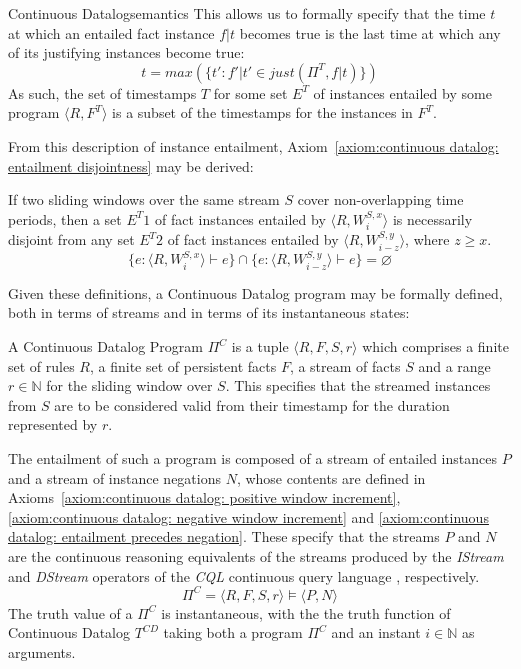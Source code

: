 \begin{nestedsection}{Continuous Datalog}{semantics}
This allows us to formally specify that the time $t$ at which an entailed fact
instance ${f | t}$ becomes true is the last time at which any of its
justifying instances become true:
\[ t = max(\{ t' : f' | t' \in just(\Pi^T, f | t) \}) \]
As such, the set of timestamps $T$ for some set $E^T$ of instances entailed by some
program ${\langle R, F^T \rangle}$ is a subset of the timestamps for the instances in $F^T$.

From this description of instance entailment,
Axiom~\ref{axiom:continuous datalog: entailment disjointness} may be
derived:

\begin{axiom}\label{axiom:continuous datalog: entailment disjointness}
If two sliding windows over the same stream $S$ cover non-overlapping time periods,
then a set ${E^T1}$ of fact instances entailed by ${\langle R, W^{S,x}_i \rangle}$
is necessarily disjoint from any set ${E^T2}$ of fact instances entailed by
${\langle R, W^{S,y}_{i-z} \rangle}$, where ${z \geq x}$.
\[ \{ e : \langle R , W^{S,x}_i \rangle \vdash e \} \cap \{ e : \langle R , W^{S,y}_{i-z} \rangle \vdash e \} = \varnothing \]
\end{axiom}

Given these definitions, a Continuous Datalog program may be formally
defined, both in terms of streams and in terms of its instantaneous
states:

\begin{definition}\label{def:continuous datalog: CDP}
A Continuous Datalog Program $\Pi^C$ is a tuple $\langle R, F, S, r
\rangle$ which comprises a finite set of rules $R$, a finite set of persistent
facts $F$, a stream of facts $S$ and a range $r \in \mathbb{N}$ for
the sliding window over $S$. This specifies that the streamed instances from $S$ are
to be considered valid from their timestamp for the duration represented
by $r$.

The entailment of such a program is composed of a stream of entailed
instances $P$ and a stream of instance negations $N$, whose contents
are defined in 
Axioms~\ref{axiom:continuous datalog: positive window increment}, 
\ref{axiom:continuous datalog: negative window increment} and
\ref{axiom:continuous datalog: entailment precedes negation}. 
These specify that the streams $P$ and $N$ are the continuous
reasoning equivalents of the streams produced by the \emph{IStream}
and \emph{DStream} operators of the \emph{CQL} continuous query
language \citep{CQL}, respectively.
\[ \Pi^C = \langle R, F, S, r \rangle \vDash \langle P, N \rangle \]
The truth value of a $\Pi^C$ is instantaneous, with the the truth
function of Continuous Datalog $T^{CD}$ taking both a program ${\Pi^C}$
and an instant ${i \in \mathbb{N}}$ as arguments.
\end{definition}


\end{nestedsection}
